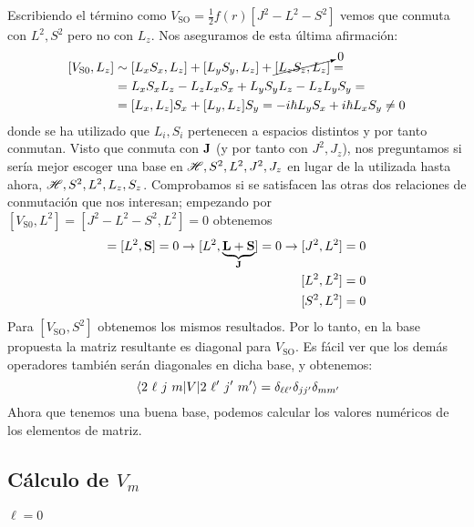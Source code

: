 Escribiendo el término como $V_\text{SO}=
\frac{1}{2}f(r)[J^2-L^2-S^2]$ vemos que conmuta con $L^2,S^2$ pero no
con $L_z$. Nos aseguramos de esta última afirmación:
\begin{equation}
  \begin{split}
    [V_\text{S0},L_z] &\sim [L_xS_x,L_z] + [L_yS_y,L_z] +
    \cancelto{0}{[L_zS_z,L_z]} = \\ &= L_xS_xL_z -L_zL_xS_x+L_yS_yL_z
    -L_zL_yS_y = \\ &= [L_x,L_z]S_x + [L_y,L_z]S_y = -i \hbar L_yS_x+i
    \hbar L_xS_y \neq 0
  \end{split}
\end{equation}
donde se ha utilizado que $L_i,S_i$ pertenecen a espacios distintos y
por tanto conmutan. Visto que conmuta con $\bm{\mathrm{J}}$ (y por tanto
con $J^2,J_z$), nos
preguntamos si sería mejor escoger una base en
$ \mathscr{H} ,S^2,L^2,J^2,J_z$ en lugar de la
utilizada hasta ahora,
$ \mathscr{H} , S^2, L^2, L_z , S_z$. Comprobamos si se satisfacen las
otras dos relaciones de conmutación que nos interesan; empezando por
$[V_\text{S0},L^2] = [J^2-L^2-S^2,L^2]=0$ obtenemos
\begin{align}
    [L^2,\boldrm{L}]= [L^2,\boldrm{S}] = 0 \rightarrow
    [L^2,\underbrace{\boldrm{L}+\boldrm{S}}_{\boldrm{J}}] = 0
    \rightarrow [J^2,L^2]&=0\\
  [L^2,L^2] &= 0 \\
  [S^2,L^2]&=0
\end{align}
Para $[V_\text{SO},S^2]$ obtenemos los mismos resultados. Por lo
tanto, en la base propuesta la matriz resultante es diagonal para
$V_\text{SO}$. Es fácil ver que los demás operadores también serán
diagonales en dicha base, y obtenemos:
\begin{equation}
  \matrixel{2\ \ell\ j\ m}{V}{2 \ \ell' \ j'  \ m'} = \delta_{\ell\ell'}\delta_{jj'}\delta_{mm'}
\end{equation}
Ahora que tenemos una buena base, podemos calcular los valores numéricos de
los elementos de matriz.
\subsection{Cálculo de $V_m$}
\paragraph{$\ell=0$}
\label{paragraph:l0vm}


